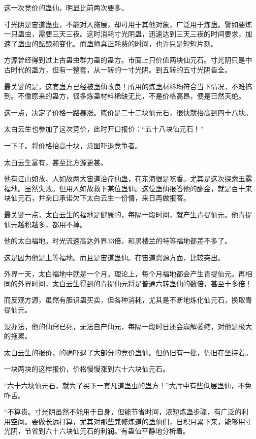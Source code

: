 \begin{this_body}
这一次竞价的蛊仙，明显比前两次要多。

寸光阴是宙道蛊虫，不能对人施展，却可用于其他对象，广泛用于炼蛊。譬如要炼一只蛊虫，需要三天三夜。这时消耗寸光阴蛊，迅速达到三天三夜的时间要求，加速了蛊虫的酝酿和变化。而蛊师真正耗费的时间，也许只是短短片刻。

方源曾经得到过上古蛊虫群力蛊的蛊方。市面上只价值两块仙元石。寸光阴只是中古时代的蛊方，但有一整套，从一转的一寸光阴。到五转的五寸光阴皆全。

最关键的是，这套蛊方已经被蛊仙改良！所用的炼蛊材料均符合当下情况，不难搞到。不像原来的蛊方，很多炼蛊材料稀缺无比，不是价格高昂，便是已然灭绝。

这一点，决定了价格一路暴涨。底价是二十二块仙元石，很快就抬高到四十八块。

太白云生也参加了这次竞价，此时开口报价：“五十八块仙元石！”

一下子。将价格抬高十块，意图吓退竞争者。

太白云生富有，甚至比方源更甚。

他有江山如故、人如故两大宙道治疗仙蛊，在东海很是吃香。尤其是这次探索玉露福地。虽然失败。但用人如故救下某位蛊仙。这位蛊仙报答他的酬金，就是百十来块仙元石，并亲口承诺欠下太白云生一份情，来日再做报答。

最关键一点，太白云生的福地是健康的，每隔一段时间，就产生青提仙元。他青提仙元越积越多，都用不掉。

他的太白福地。时光流速高达外界33倍，和黑楼兰的特等福地都差不多了。

这是因为他是上等福地。而且是宙道蛊仙。在宙道资源方面，比较突出。

外界一天，太白福地中就是一个月。理论上，每个月福地都会产生青提仙元。再相同的外界时间，太白云生得到的青提仙元将是普通六转蛊仙的数倍，甚至十多倍！

而反观方源，虽然有胆识蛊买卖，但各种消耗，尤其是不断地炼化仙元石，换取青提仙元。

没办法，他的仙窍已死，无法自产仙元，每隔一段时日还会崩解萎缩，对他是极大的拖累。

太白云生的报价，的确吓退了大部分的竞价蛊仙。但仍旧有一批，仍旧在坚持着。

一块两块的这样报价，价格慢慢涨到六十六块仙元石。

“六十六块仙元石，就为了买下一套凡道蛊虫的蛊方！”大厅中有些低层蛊仙，不免咋舌。

“不算贵。寸光阴虽然不能用于自身，但能节省时间，浓短炼蛊步骤，有广泛的利用空间。要做长远打算，尤其对那些兼修炼道的蛊仙们，日积月累下来，能够用寸光阴，节省到六十六块仙元石的利润。”有蛊仙平静地分析着。


\end{this_body}
